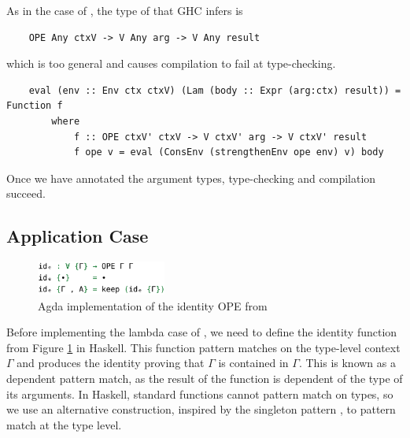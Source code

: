 As in the  case of , the type of  that GHC infers is 

\begin{lstlisting}
    OPE Any ctxV -> V Any arg -> V Any result
\end{lstlisting}

which is too general and causes compilation to fail at type-checking.

\begin{lstlisting}
    eval (env :: Env ctx ctxV) (Lam (body :: Expr (arg:ctx) result)) = Function f 
        where
            f :: OPE ctxV' ctxV -> V ctxV' arg -> V ctxV' result
            f ope v = eval (ConsEnv (strengthenEnv ope env) v) body
\end{lstlisting}

Once we have annotated the argument types, type-checking and compilation succeed.

\subsection{Application Case}
\label{subsect:typedEvalAppCase}

\begin{figure}[h]
    \centering
    \includegraphics[width=0.38\textwidth]{./images/agda_id_ope.png}
    \caption{Agda implementation of the identity OPE from \cite{AgdaNbe}}
    \label{fig:agdaIdOPE}
\end{figure}

Before implementing the lambda case of , we need to define the identity  function from Figure \ref{fig:agdaIdOPE} in Haskell. This function pattern matches on the type-level context $\Gamma$ and produces the identity  proving that $\Gamma$ is contained in $\Gamma$. This is known as a dependent pattern match, as the result of the function is dependent of the type of its arguments. In Haskell, standard functions cannot pattern match on types, so we use an alternative construction, inspired by the singleton pattern \cite{singletons}, to pattern match at the type level.



